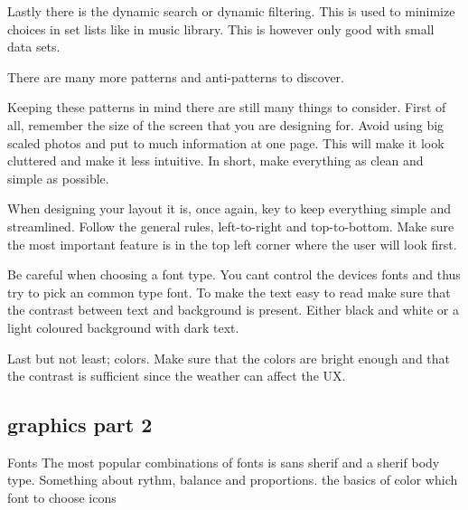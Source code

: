 Lastly there is the dynamic search or dynamic filtering. This is used to minimize choices in set lists like in music library. This is however only good with small data sets.\cite{Pattern}

There are many more patterns and anti-patterns to discover. \cite{Pattern}

Keeping these patterns in mind there are still many things to consider. 
First of all, remember the size of the screen that you are designing for. Avoid using big scaled photos and put to much information at one page. This will make it look cluttered and make it less intuitive. \cite{Graphic}
In short, make everything as clean and simple as possible. 

When designing your layout it is, once again, key to keep everything simple and streamlined. 
Follow the general rules, left-to-right and top-to-bottom. Make sure the most important feature is in the top left corner where the user will look first.\cite{Graphic}

Be careful when choosing a font type. You cant control the devices fonts and thus try to pick an common type font.  \cite{Graphic} To make the text easy to read make sure that the contrast between text and background is present. Either black and white or a light coloured background with dark text. \cite{Graphic}

Last but not least; colors. Make sure that the colors are bright enough and that the contrast is sufficient since the weather can affect the UX. \cite{Graphic}

\subsection{graphics part 2}

Fonts
The most popular combinations of fonts is sans sherif and a sherif body type. \cite{TypeComb}
Something about rythm, balance and proportions. \cite{DesignPrinciple}
the basics of color \cite{Colour}
which font to choose \cite{Font}
icons \cite{Icon}

